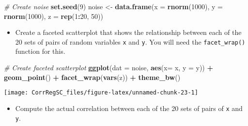 \documentclass[
]{book}
\newenvironment{Shaded}{\begin{snugshade}}{\end{snugshade}}
\newcommand{\CommentTok}[1]{\textcolor[rgb]{0.56,0.35,0.01}{\textit{#1}}}
\newcommand{\DataTypeTok}[1]{\textcolor[rgb]{0.13,0.29,0.53}{#1}}
\newcommand{\DecValTok}[1]{\textcolor[rgb]{0.00,0.00,0.81}{#1}}
\newcommand{\KeywordTok}[1]{\textcolor[rgb]{0.13,0.29,0.53}{\textbf{#1}}}
\newcommand{\NormalTok}[1]{#1}
\newcommand{\OperatorTok}[1]{\textcolor[rgb]{0.81,0.36,0.00}{\textbf{#1}}}
\newcommand{\StringTok}[1]{\textcolor[rgb]{0.31,0.60,0.02}{#1}}
\providecommand{\tightlist}{%
  \setlength{\itemsep}{0pt}\setlength{\parskip}{0pt}}
\begin{document}
\begin{Shaded}
\begin{Highlighting}[]
\CommentTok{# Create noise}
\KeywordTok{set.seed}\NormalTok{(}\DecValTok{9}\NormalTok{)}
\NormalTok{noise <-}\StringTok{ }\KeywordTok{data.frame}\NormalTok{(}\DataTypeTok{x =} \KeywordTok{rnorm}\NormalTok{(}\DecValTok{1000}\NormalTok{), }\DataTypeTok{y =} \KeywordTok{rnorm}\NormalTok{(}\DecValTok{1000}\NormalTok{), }\DataTypeTok{z =} \KeywordTok{rep}\NormalTok{(}\DecValTok{1}\OperatorTok{:}\DecValTok{20}\NormalTok{, }\DecValTok{50}\NormalTok{))}
\end{Highlighting}
\end{Shaded}

\begin{itemize}
\tightlist
\item
  Create a faceted scatterplot that shows the relationship between each of the 20 sets of pairs of random variables \texttt{x} and \texttt{y}. You will need the \texttt{facet\_wrap()} function for this.
\end{itemize}

\begin{Shaded}
\begin{Highlighting}[]
\CommentTok{# Create faceted scatterplot}
\KeywordTok{ggplot}\NormalTok{(}\DataTypeTok{dat =}\NormalTok{ noise, }\KeywordTok{aes}\NormalTok{(}\DataTypeTok{x=}\NormalTok{ x, }\DataTypeTok{y =}\NormalTok{ y)) }\OperatorTok{+}\StringTok{ }
\StringTok{  }\KeywordTok{geom_point}\NormalTok{() }\OperatorTok{+}\StringTok{ }
\StringTok{  }\KeywordTok{facet_wrap}\NormalTok{(}\KeywordTok{vars}\NormalTok{(z)) }\OperatorTok{+}\StringTok{ }
\StringTok{  }\KeywordTok{theme_bw}\NormalTok{()}
\end{Highlighting}
\end{Shaded}

\begin{center}\texttt{[image: CorrRegSC\_files/figure-latex/unnamed-chunk-23-1]} \end{center}

\begin{itemize}
\tightlist
\item
  Compute the actual correlation between each of the 20 sets of pairs of \texttt{x} and \texttt{y}.
\end{itemize}

\begin{Shaded}
\end{Shaded}
\end{document}
